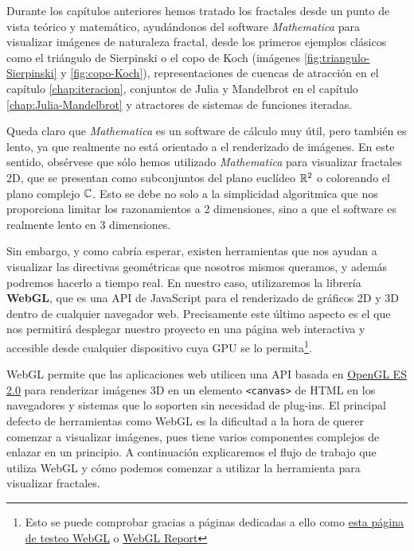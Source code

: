 %
%

Durante los capítulos anteriores hemos tratado los fractales desde un punto de vista teórico y matemático, ayudándonos del software \textit{Mathematica} para visualizar imágenes de naturaleza fractal, desde los primeros ejemplos clásicos como el triángulo de Sierpinski o el copo de Koch (imágenes \ref{fig:triangulo-Sierpinski} y \ref{fig:copo-Koch}), representaciones de cuencas de atracción en el capítulo \ref{chap:iteracion}, conjuntos de Julia y Mandelbrot en el capítulo \ref{chap:Julia-Mandelbrot} y atractores de sistemas de funciones iteradas. %

Queda claro que \textit{Mathematica} es un software de cálculo muy útil, pero también es lento, ya que realmente no está orientado a el renderizado de imágenes. En este sentido, obsérvese que sólo hemos utilizado \textit{Mathematica} para visualizar fractales 2D, que se presentan como subconjuntos del plano euclídeo $\mathbb{R}^2$ o coloreando el plano complejo $\mathbb{C}$. Esto se debe no solo a la simplicidad algoritmica que nos proporciona limitar los razonamientos a 2 dimensiones, sino a que el software es realmente lento en 3 dimensiones.

Sin embargo, y como cabría esperar, existen herramientas que nos ayudan a visualizar las directivas geométricas que nosotros mismos queramos, y además podremos hacerlo a tiempo real. En nuestro caso, utilizaremos la librería \textbf{WebGL}, que es una API de JavaScript para el renderizado de gráficos 2D y 3D dentro de cualquier navegador web. Precisamente este último aspecto es el que nos permitirá desplegar nuestro proyecto en una página web interactiva y accesible desde cualquier dispositivo cuya GPU se lo permita\footnote{Esto se puede comprobar gracias a páginas dedicadas a ello como \href{https://get.webgl.org/}{esta página de testeo WebGL} o \href{http://webglreport.com/}{WebGL Report}}.

WebGL permite que las aplicaciones web utilicen una API basada en \href{https://www.khronos.org/opengles/}{OpenGL ES 2.0} para renderizar imágenes 3D en un elemento \verb|<canvas>| de HTML en los navegadores y sistemas que lo soporten sin necesidad de plug-ins. El principal defecto de herramientas como WebGL es la dificultad a la hora de querer comenzar a visualizar imágenes, pues tiene varios componentes complejos de enlazar en un principio. A continuación explicaremos el flujo de trabajo que utiliza WebGL y cómo podemos comenzar a utilizar la herramienta para visualizar fractales.

